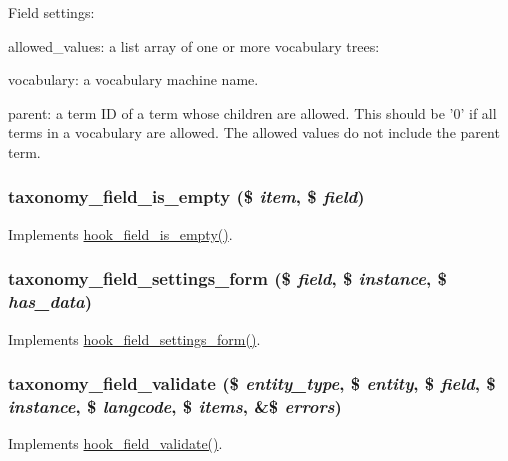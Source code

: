 Field settings:
\begin{DoxyItemize}
\item allowed\_\-values: a list array of one or more vocabulary trees:
\begin{DoxyItemize}
\item vocabulary: a vocabulary machine name.
\item parent: a term ID of a term whose children are allowed. This should be '0' if all terms in a vocabulary are allowed. The allowed values do not include the parent term. 
\end{DoxyItemize}
\end{DoxyItemize}\hypertarget{taxonomy_8module_ad4c934f62d87fa9be9f4e7d651226435}{
\subsubsection[{taxonomy\_\-field\_\-is\_\-empty}]{\setlength{\rightskip}{0pt plus 5cm}taxonomy\_\-field\_\-is\_\-empty (\$ {\em item}, \/  \$ {\em field})}}
\label{taxonomy_8module_ad4c934f62d87fa9be9f4e7d651226435}
Implements \hyperlink{group__field__types_ga192dd7e7a02a7bc9e0af8b67b187b071}{hook\_\-field\_\-is\_\-empty()}. \hypertarget{taxonomy_8module_a41b526275b013140cd47e59bb0a36e88}{
\subsubsection[{taxonomy\_\-field\_\-settings\_\-form}]{\setlength{\rightskip}{0pt plus 5cm}taxonomy\_\-field\_\-settings\_\-form (\$ {\em field}, \/  \$ {\em instance}, \/  \$ {\em has\_\-data})}}
\label{taxonomy_8module_a41b526275b013140cd47e59bb0a36e88}
Implements \hyperlink{group__field__types_gab8a2ed808857cc6f3cb661fbc99d30d4}{hook\_\-field\_\-settings\_\-form()}. \hypertarget{taxonomy_8module_a370c4e737b4055bb0cf822a6be88a714}{
\subsubsection[{taxonomy\_\-field\_\-validate}]{\setlength{\rightskip}{0pt plus 5cm}taxonomy\_\-field\_\-validate (\$ {\em entity\_\-type}, \/  \$ {\em entity}, \/  \$ {\em field}, \/  \$ {\em instance}, \/  \$ {\em langcode}, \/  \$ {\em items}, \/  \&\$ {\em errors})}}
\label{taxonomy_8module_a370c4e737b4055bb0cf822a6be88a714}
Implements \hyperlink{group__field__types_gaa7d8846e8fe3766e1b3435cd50b965be}{hook\_\-field\_\-validate()}.


